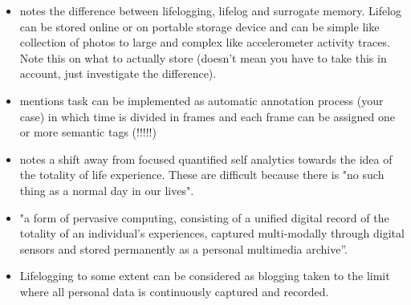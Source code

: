 \begin{itemize}
	\item \citet{gurrin2014lifelogging} notes the difference between lifelogging, lifelog and surrogate memory. Lifelog can be stored online or on portable storage device and can be simple like collection of photos to large and complex like accelerometer activity traces. Note this on what to actually store (doesn't mean you have to take this in account, just investigate the difference).
	\item \citet{bayindir2017survey} mentions task can be implemented as automatic annotation process (your case) in which time is divided in frames and each frame can be assigned one or more semantic tags (!!!!!)
	\item \citet{gurrin2014lifelogging} notes a shift away from focused quantified self analytics towards the idea of the totality of life experience. These are difficult because there is "no such thing as a normal day in our lives".
	\item \citet{dodge2007outlines} "a form of pervasive computing, consisting of a unified digital record of the totality of an individual’s experiences, captured multi-modally through digital sensors and stored permanently as a personal multimedia
	archive”.
	\item \citet{mears2016virtual} Lifelogging to some extent can be considered as blogging taken to the limit where all personal data is continuously captured and recorded.
\end{itemize}


